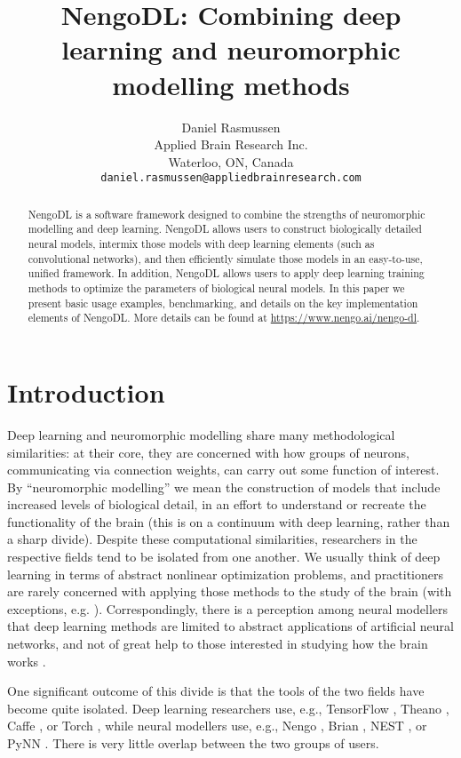 \documentclass{article}
\title{NengoDL: Combining deep learning and neuromorphic modelling methods}
\author{
  Daniel Rasmussen \\
  Applied Brain Research Inc.\\
  Waterloo, ON, Canada \\
  \texttt{daniel.rasmussen@appliedbrainresearch.com}
}
\begin{document}
\maketitle

\begin{abstract}
NengoDL is a software framework designed to combine the strengths of neuromorphic modelling and deep learning.  NengoDL allows users to construct biologically detailed neural models, intermix those models with deep learning elements (such as convolutional networks), and then efficiently simulate those models in an easy-to-use, unified framework.  In addition, NengoDL allows users to apply deep learning training methods to optimize the parameters of biological neural models.  In this paper we present basic usage examples, benchmarking, and details on the key implementation elements of NengoDL.  More details can be found at \url{https://www.nengo.ai/nengo-dl}.
\end{abstract}

\section{Introduction}

Deep learning and neuromorphic modelling share many methodological similarities: at their core, they are concerned with how groups of neurons, communicating via connection weights, can carry out some function of interest.  By ``neuromorphic modelling'' we mean the construction of models that include increased levels of biological detail, in an effort to understand or recreate the functionality of the brain (this is on a continuum with deep learning, rather than a sharp divide).  Despite these computational similarities, researchers in the respective fields tend to be isolated from one another.  We usually think of deep learning in terms of abstract nonlinear optimization problems, and practitioners are rarely concerned with applying those methods to the study of the brain (with exceptions, e.g. \citet{Kriegeskorte2015,Yamins2016}).  Correspondingly, there is a perception among neural modellers that deep learning methods are limited to abstract applications of artificial neural networks, and not of great help to those interested in studying how the brain works \citep{Kay2017}.

One significant outcome of this divide is that the tools of the two fields have become quite isolated.  Deep learning researchers use, e.g., TensorFlow \citep{Abadi2016}, Theano \citep{Team2016}, Caffe \citep{Jia2014}, or Torch \citep{Collobert2011}, while neural modellers use, e.g., Nengo \citep{Bekolay2014}, Brian \citep{Stimberg2013}, NEST \citep{Gewaltig2007}, or PyNN \citep{Davison2009}. There is very little overlap between the two groups of users.
\end{document}
